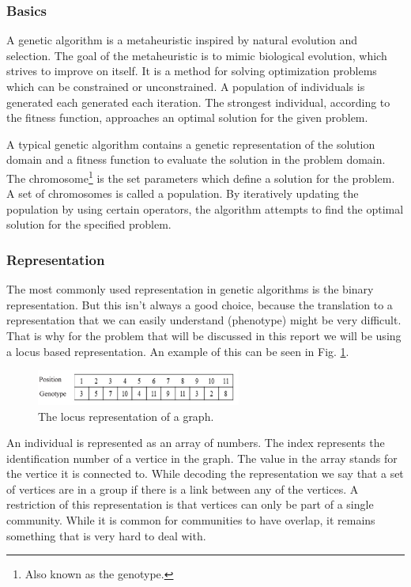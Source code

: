 \subsubsection{Basics}
A genetic algorithm is a metaheuristic inspired by natural evolution and selection.
The goal of the metaheuristic is to mimic biological evolution, which strives to improve on itself.
It is a method for solving optimization problems which can be constrained or unconstrained.
A population of individuals is generated each generated each iteration.
The strongest individual, according to the fitness function, approaches an optimal solution for the given problem.

A typical genetic algorithm contains a genetic representation of the solution domain and a fitness function to evaluate the solution in the problem domain.
The chromosome\footnote{Also known as the genotype.} is the set parameters which define a solution for the problem.
A set of chromosomes is called a population.
By iteratively updating the population by using certain operators, the algorithm attempts to find the optimal solution for the specified problem.

\subsubsection{Representation}
The most commonly used representation in genetic algorithms is the binary representation.
But this isn't always a good choice, because the translation to a representation that we can easily understand (phenotype) might be very difficult.
That is why for the problem that will be discussed in this report we will be using a locus based representation.
An example of this can be seen in Fig. \ref{figure:locus}.

\begin{figure}
\begin{center}
\includegraphics[width=0.6\textwidth]{locus.png}
\caption{The locus representation of a graph.}\label{figure:locus}
\end{center}
\end{figure}

An individual is represented as an array of numbers. 
The index represents the identification number of a vertice in the graph.
The value in the array stands for the vertice it is connected to.
While decoding the representation we say that a set of vertices are in a group if there is a link between any of the vertices.
A restriction of this representation is that vertices can only be part of a single community.
While it is common for communities to have overlap, it remains something that is very hard to deal with.

